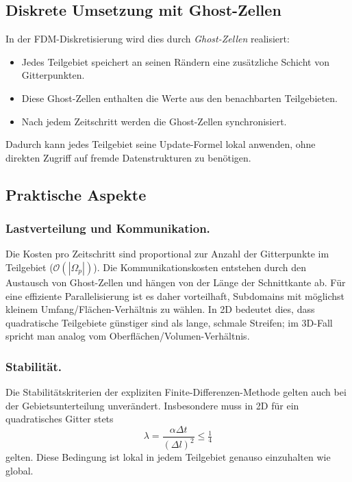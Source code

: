 \subsection{Diskrete Umsetzung mit Ghost-Zellen}

In der FDM-Diskretisierung wird dies durch \emph{Ghost-Zellen} realisiert:
\begin{itemize}
	\item Jedes Teilgebiet speichert an seinen Rändern eine zusätzliche Schicht von Gitterpunkten.
	\item Diese Ghost-Zellen enthalten die Werte aus den benachbarten Teilgebieten.
	\item Nach jedem Zeitschritt werden die Ghost-Zellen synchronisiert.
\end{itemize}

Dadurch kann jedes Teilgebiet seine Update-Formel lokal anwenden, ohne direkten Zugriff auf fremde Datenstrukturen zu benötigen.

\subsection{Praktische Aspekte}

\subsubsection {Lastverteilung und Kommunikation.}
Die Kosten pro Zeitschritt sind proportional zur Anzahl der Gitterpunkte im Teilgebiet 
($\mathcal{O}(|\Omega_p|)$).  
Die Kommunikationskosten entstehen durch den Austausch von Ghost-Zellen und hängen von der Länge der Schnittkante ab.  
Für eine effiziente Parallelisierung ist es daher vorteilhaft, Subdomains mit möglichst kleinem 
Umfang/Flächen-Verhältnis zu wählen.  
In 2D bedeutet dies, dass quadratische Teilgebiete günstiger sind als lange, schmale Streifen; 
im 3D-Fall spricht man analog vom Oberflächen/Volumen-Verhältnis.  

\subsubsection {Stabilität.}
Die Stabilitätskriterien der expliziten Finite-Differenzen-Methode gelten auch bei der Gebietsunterteilung unverändert.  
Insbesondere muss in 2D für ein quadratisches Gitter stets
\[
\lambda = \frac{\alpha \Delta t}{(\Delta l)^2} \leq \tfrac{1}{4}
\]
gelten.  
Diese Bedingung ist lokal in jedem Teilgebiet genauso einzuhalten wie global.  



